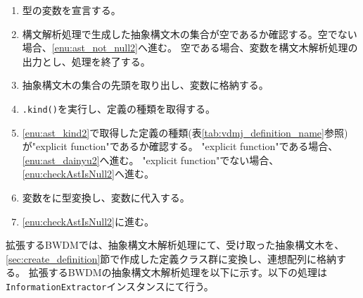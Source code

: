 \documentclass[uplatex, report, a4j, 10pt]{jsbook}
\newcommand\ttt[1]{\texttt{#1}}
\begin{document}

\begin{enumerate}
  \item \TCExplicitFunctionDefinition{}型の変数\tcFunctionDefinition{}を宣言する。
  \item\label{enu:checkAstIsNull2} 構文解析処理で生成した抽象構文木の集合が空であるか確認する。空でない場合、\ref{enu:ast_not_null2}へ進む。
        空である場合、変数\tcFunctionDefinition{}を構文木解析処理の出力とし、処理を終了する。
  \item\label{enu:ast_not_null2} 抽象構文木の集合の先頭を取り出し、変数\astDefinition{}に格納する。
  \item\label{enu:ast_kind2} \astDefinition{}\ttt{.kind()}を実行し、定義の種類を取得する。
  \item \ref{enu:ast_kind2}で取得した定義の種類(表\ref{tab:vdmj_definition_name}参照)が"explicit function"であるか確認する。
        "explicit function"である場合、\ref{enu:ast_dainyu2}へ進む。
        "explicit function"でない場合、\ref{enu:checkAstIsNull2}へ進む。
  \item\label{enu:ast_dainyu2} 変数\astDefinition{}を\TCExplicitFunctionDefinition{}に型変換し、変数\tcFunctionDefinition{}に代入する。
  \item \ref{enu:checkAstIsNull2}に進む。
\end{enumerate}


拡張するBWDMでは、抽象構文木解析処理にて、受け取った抽象構文木を、\ref{sec:create_definition}節で作成した定義クラス群に変換し、連想配列に格納する。
拡張するBWDMの抽象構文木解析処理を以下に示す。以下の処理は\ttt{InformationExtractor}インスタンスにて行う。
\end{document}
